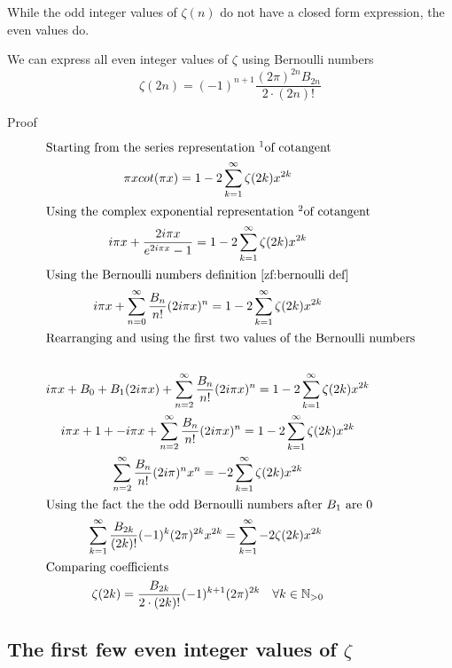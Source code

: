 \documentclass[a4paper]{article}
\begin{document}
While the odd integer values of $\zeta(n)$ do not have a closed form expression, the even values do.

\begin{theorem}
We can express all even integer values of $\zeta$ using Bernoulli numbers
\begin{equation} \label{zf:even zeta} 
\zeta(2n) = (-1)^{n+1} \frac{(2\pi)^{2n} B_{2n}}{2 \cdot (2n)!}
\end{equation}

Proof
\begin{gather*}
\intertext{Starting from the series representation \footnotemark of cotangent}
\pi x cot(\pi x) = 1 - 2 \sum_{k=1}^{\infty} \zeta(2k) x^{2k}
\\
\intertext{Using the complex exponential representation \footnotemark of cotangent}
i \pi x +  \frac{2i \pi x}{e^{2 i\pi x} -1} = 1 - 2 \sum_{k=1}^{\infty} \zeta(2k) x^{2k}
\\
\intertext{Using the Bernoulli numbers definition \ref{zf:bernoulli def}} 
i \pi x + \sum_{n=0}^{\infty} \frac{B_n}{n!} (2 i\pi x)^n
 = 1 - 2 \sum_{k=1}^{\infty} \zeta(2k) x^{2k}
\\
\intertext{Rearranging and using the first two values of the Bernoulli numbers} 
\\
i \pi x + B_0 + B_1 (2 i \pi x) +  \sum_{n=2}^{\infty} \frac{B_n}{n!} (2 i\pi x)^n
 = 1 - 2 \sum_{k=1}^{\infty} \zeta(2k) x^{2k}
\\
i \pi x + 1 + - i \pi x +  \sum_{n=2}^{\infty} \frac{B_n}{n!} (2 i\pi x)^n
 = 1 - 2 \sum_{k=1}^{\infty} \zeta(2k) x^{2k}
\\
\sum_{n=2}^{\infty} \frac{B_n}{n!} (2 i\pi)^n x^n
 = - 2 \sum_{k=1}^{\infty} \zeta(2k) x^{2k}
\\
\intertext{Using the fact the the odd Bernoulli numbers after $B_1$ are 0} 
\sum_{k=1}^{\infty} \frac{B_{2k}}{(2k)!} (-1)^{k}(2 \pi)^{2k} x^{2k}
 = \sum_{k=1}^{\infty} - 2 \zeta(2k) x^{2k}\
\\
\intertext{Comparing coefficients}
\zeta(2k) =  \frac{B_{2k}}{2 \cdot (2k)!} (-1)^{k+1}(2 \pi)^{2k} \quad \forall  k \in \mathbb N_{> 0}
\end{gather*}
\end{theorem}

\addtocounter{footnote}{-1}

\subsection{The first few even integer values of $\zeta$}
\end{document}
